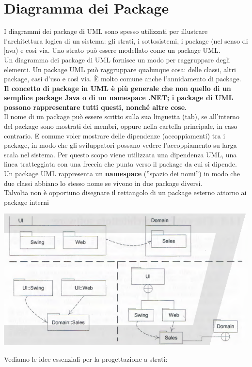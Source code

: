 \documentclass[a4paper,12pt, oneside]{book}
\begin{document}
\section{Diagramma dei Package}
I diagrammi dei package di UML sono spesso utilizzati per illustrare l'architettura logica
di un sistema: gli strati, i sottosistemi, i package (nel senso di ]ava) e così via. Uno strato
può essere modellato come un package UML.\\
Un diagramma dei package di UML fornisce un modo per raggruppare degli elementi.
Un package UML può raggruppare qualunque cosa: delle classi, altri package, casi d'uso
e così via. È molto comune anche l'annidamento di package. \textbf{Il concetto di package in
UML è più generale che non quello di un semplice package Java o di un namespace
.NET; i package di UML possono rappresentare tutti questi, nonché altre cose.}\\
Il nome di un package può essere scritto sulla sua linguetta (tab), se all'interno del
package sono mostrati dei membri, oppure nella cartella principale, in caso contrario.
E comune voler mostrare delle dipendenze (accoppiamenti) tra i package, in modo che
gli sviluppatori possano vedere l'accoppiamento su larga scala nel sistema. Per questo
scopo viene utilizzata una dipendenza UML, una linea tratteggiata con una freccia che
punta verso il package da cui si dipende.\\
Un package UML rappresenta un\textbf{ namespace} (''spazio dei nomi'') in modo
che due classi abbiano lo stesso nome se vivono in due package diversi.\\
Talvolta non è opportuno disegnare il rettangolo di un package esterno attorno ai
package interni
\begin{center}
\includegraphics[scale=0.5]{img/log3.png}
\end{center}
Vediamo le idee essenziali per la progettazione a strati:
\end{document}
